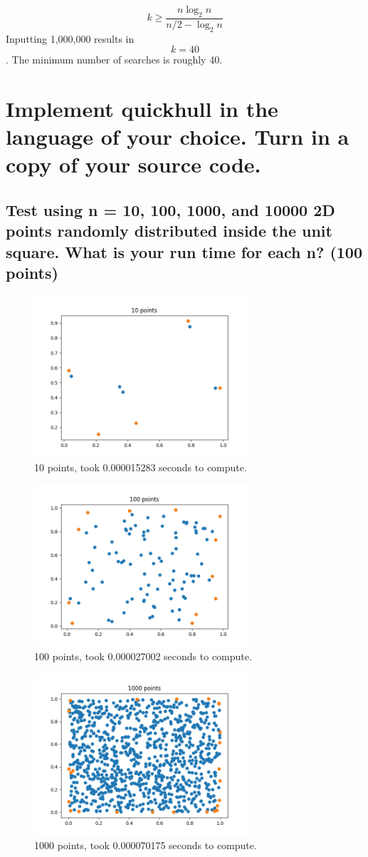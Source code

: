 \documentclass{article}
\begin{document}
$$
k\geq \frac{n\log_2n}{n/2-\log_2n}
$$
Inputting 1,000,000 results in \[k=40\].
The minimum number of searches is roughly 40.
\section{Implement quickhull in the language of your choice.  Turn in a copy of your
source code.}
\subsection{Test using n = 10, 100, 1000, and 10000 2D points randomly distributed inside the unit square.  What is your run time for each n?  (100 points)}
\begin{figure}[h!]
    \includegraphics[width=8cm]{10 points.png}
    \caption{10 points, took 0.000015283 seconds to compute.}
\end{figure}
\begin{figure}[h!]
    \includegraphics[width=8cm]{100 points.png}
    \caption{100 points, took 0.000027002 seconds to compute.}
\end{figure}
\begin{figure}[h!]
    \includegraphics[width=8cm]{1000 points.png}
    \caption{1000 points, took 0.000070175 seconds to compute.}
\end{figure}
\end{document}
